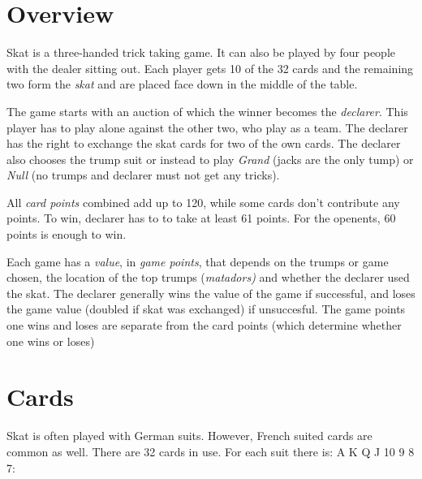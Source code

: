 \documentclass[letter]{article}
\begin{document}
  \section*{Overview}

  Skat is a three-handed trick taking game. It can also be played by four
  people with the dealer sitting out. Each player gets 10 of the 32 cards and
  the remaining two form the \emph{skat} and are placed face down in the middle
  of the table.

  The game starts with an auction of which the winner becomes the
  \emph{declarer}. This player has to play alone against the other two, who play
  as a team. The declarer has the right to exchange the skat cards for two of
  the own cards. The declarer also chooses the trump suit or instead to play
  \emph{Grand} (jacks are the only tump) or \emph{Null} (no trumps and declarer
  must not get any tricks).

  All \emph{card points} combined add up to 120, while some cards don't
  contribute any points. To win, declarer has to to take at least 61 points. For
  the openents, 60 points is enough to win.

  Each game has a \emph{value}, in \emph{game points}, that depends on the
  trumps or game chosen, the location of the top trumps (\emph{matadors)} and
  whether the declarer used the skat. The declarer generally wins the value of
  the game if successful, and loses the game value (doubled if skat was
  exchanged) if unsuccesful. The game points one wins and loses are separate
  from the card points (which determine whether one wins or loses)


  \section*{Cards}
  
  Skat is often played with German suits. However, French suited cards are
  common as well. There are 32 cards in use. For each suit there is: A K Q J 10
  9 8 7:
\end{document}
